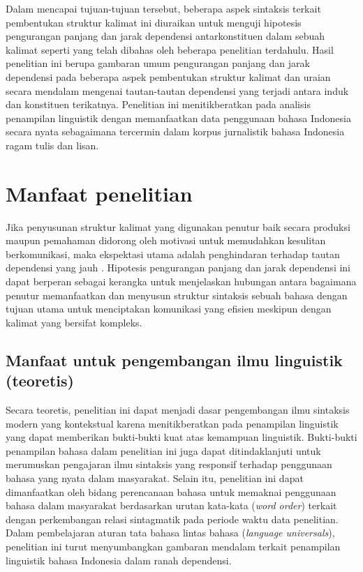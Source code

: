 Dalam mencapai tujuan-tujuan tersebut, beberapa aspek sintaksis terkait pembentukan struktur kalimat ini diuraikan untuk menguji hipotesis pengurangan panjang dan jarak dependensi antarkonstituen dalam sebuah kalimat seperti yang telah dibahas oleh beberapa penelitian terdahulu. Hasil penelitian ini berupa gambaran umum pengurangan panjang dan jarak dependensi pada beberapa aspek pembentukan struktur kalimat dan uraian secara mendalam mengenai tautan-tautan dependensi yang terjadi antara induk dan konstituen terikatnya. Penelitian ini menitikberatkan pada analisis penampilan linguistik dengan memanfaatkan data penggunaan bahasa Indonesia secara nyata sebagaimana tercermin dalam korpus jurnalistik bahasa Indonesia ragam tulis dan lisan.

\section{Manfaat penelitian}
Jika penyusunan struktur kalimat yang digunakan penutur baik secara produksi maupun pemahaman didorong oleh motivasi untuk memudahkan kesulitan berkomunikasi, maka ekspektasi utama adalah penghindaran terhadap tautan dependensi yang jauh \citep{futrell2015large}. Hipotesis pengurangan panjang dan jarak dependensi ini dapat berperan sebagai kerangka untuk menjelaskan hubungan antara bagaimana penutur memanfaatkan dan menyusun struktur sintaksis sebuah bahasa dengan tujuan utama untuk menciptakan komunikasi yang efisien meskipun dengan kalimat yang bersifat kompleks.

\subsection{Manfaat untuk pengembangan ilmu linguistik (teoretis)}
Secara teoretis, penelitian ini dapat menjadi dasar pengembangan ilmu sintaksis modern yang kontekstual karena menitikberatkan pada penampilan linguistik yang dapat memberikan bukti-bukti kuat atas kemampuan linguistik. Bukti-bukti penampilan bahasa dalam penelitian ini juga dapat ditindaklanjuti untuk merumuskan pengajaran ilmu sintaksis yang responsif terhadap penggunaan bahasa yang nyata dalam masyarakat. Selain itu, penelitian ini dapat dimanfaatkan oleh bidang perencanaan bahasa untuk memaknai penggunaan bahasa dalam masyarakat berdasarkan urutan kata-kata (\textit{word order}) terkait dengan perkembangan relasi sintagmatik pada periode waktu data penelitian. Dalam pembelajaran aturan tata bahasa lintas bahasa (\textit{language universals}), penelitian ini turut menyumbangkan gambaran mendalam terkait penampilan linguistik bahasa Indonesia dalam ranah dependensi.

